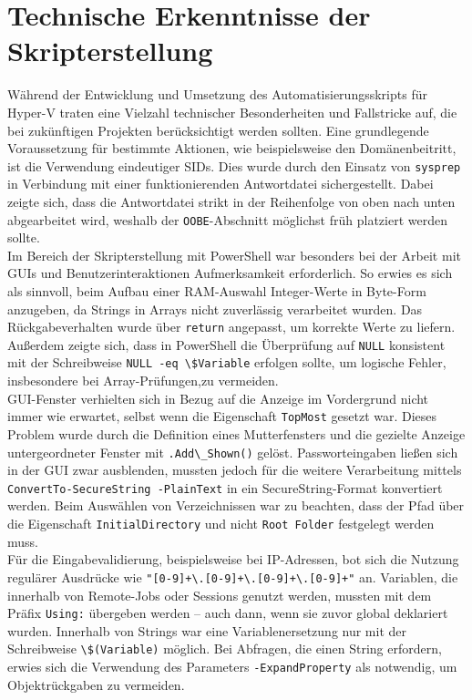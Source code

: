 \documentclass[a4paper,12pt]{article}
\begin{document}
\section{Technische Erkenntnisse der Skripterstellung}

Während der Entwicklung und Umsetzung des Automatisierungsskripts für Hyper-V traten eine Vielzahl technischer Besonderheiten und Fallstricke auf, die bei zukünftigen Projekten berücksichtigt werden sollten. Eine grundlegende Voraussetzung für bestimmte Aktionen, wie beispielsweise den Domänenbeitritt, ist die Verwendung eindeutiger SIDs. Dies wurde durch den Einsatz von \lstinline|sysprep| in Verbindung mit einer funktionierenden Antwortdatei sichergestellt. Dabei zeigte sich, dass die Antwortdatei strikt in der Reihenfolge von oben nach unten abgearbeitet wird, weshalb der \lstinline|OOBE|-Abschnitt möglichst früh platziert werden sollte.\\  


Im Bereich der Skripterstellung mit PowerShell war besonders bei der Arbeit mit GUIs und Benutzerinteraktionen Aufmerksamkeit erforderlich. So erwies es sich als sinnvoll, beim Aufbau einer RAM-Auswahl Integer-Werte in Byte-Form anzugeben, da Strings in Arrays nicht zuverlässig verarbeitet wurden. Das Rückgabeverhalten wurde über \lstinline|return| angepasst, um korrekte Werte zu liefern. Außerdem zeigte sich, dass in PowerShell die Überprüfung auf \lstinline|NULL| konsistent mit der Schreibweise \lstinline|NULL -eq \$Variable| erfolgen sollte, um logische Fehler, insbesondere bei Array-Prüfungen,zu vermeiden. \\ 

GUI-Fenster verhielten sich in Bezug auf die Anzeige im Vordergrund nicht immer wie erwartet, selbst wenn die Eigenschaft \lstinline|TopMost| gesetzt war. Dieses Problem wurde durch die Definition eines Mutterfensters und die gezielte Anzeige untergeordneter Fenster mit \lstinline|.Add\_Shown()| gelöst. Passworteingaben ließen sich in der GUI zwar ausblenden, mussten jedoch für die weitere Verarbeitung mittels \lstinline|ConvertTo-SecureString -PlainText| in ein SecureString-Format konvertiert werden. Beim Auswählen von Verzeichnissen war zu beachten, dass der Pfad über die Eigenschaft \lstinline|InitialDirectory| und nicht \lstinline|Root Folder| festgelegt werden muss.\\  

Für die Eingabevalidierung, beispielsweise bei IP-Adressen, bot sich die Nutzung regulärer Ausdrücke wie \lstinline|"[0-9]+\.[0-9]+\.[0-9]+\.[0-9]+"| an. Variablen, die innerhalb von Remote-Jobs oder Sessions genutzt werden, mussten mit dem Präfix \lstinline|Using:| übergeben werden -- auch dann, wenn sie zuvor global deklariert wurden. Innerhalb von Strings war eine Variablenersetzung nur mit der Schreibweise \lstinline|\$(Variable)| möglich. Bei Abfragen, die einen String erfordern, erwies sich die Verwendung des Parameters \lstinline|-ExpandProperty| als notwendig, um Objektrückgaben zu vermeiden.\\  
\end{document}

